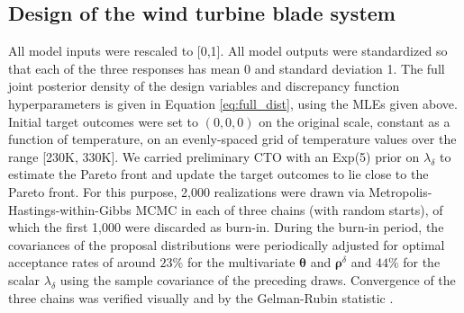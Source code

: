 \documentclass[12pt]{article}
\begin{document}
\subsection{Design of the wind turbine blade system}\label{the_model}
%
All model inputs were rescaled to [0,1].
%
All model outputs were standardized so that each of the three responses has mean 0 and standard deviation 1.
%
The full joint posterior density of the design variables and discrepancy function hyperparameters is given in Equation \eqref{eq:full_dist}, using the MLEs given above.
%
Initial target outcomes were set to $(0,0,0)$ on the original scale, constant as a function of temperature, on an evenly-spaced grid of temperature values over the range [230K, 330K].
%
We carried preliminary CTO with an Exp(5) prior on $\lambda_\delta$ to estimate the Pareto front and update the target outcomes to lie close to the Pareto front. %
%
For this purpose, 2,000 realizations were drawn via Metropolis-Hastings-within-Gibbs MCMC \citep{Metropolis1953, Hastings1970, Geman1984} in each of three chains (with random starts), of which the first 1,000 were discarded as burn-in.
%
During the burn-in period, the covariances of the proposal distributions were periodically adjusted for optimal acceptance rates of around $23\%$ for the multivariate $\boldsymbol \theta$ and $\boldsymbol\rho^\delta$ \citep{Roberts1997} and $44\%$ for the scalar $\lambda_\delta$ \citep[][p. 296]{Gelman2013} using the sample covariance of the preceding draws. %
%
%
%
Convergence of the three chains was verified visually and by the Gelman-Rubin statistic \citep[$\approx1.01$;][]{Gelman1992a}.
%
\end{document}
